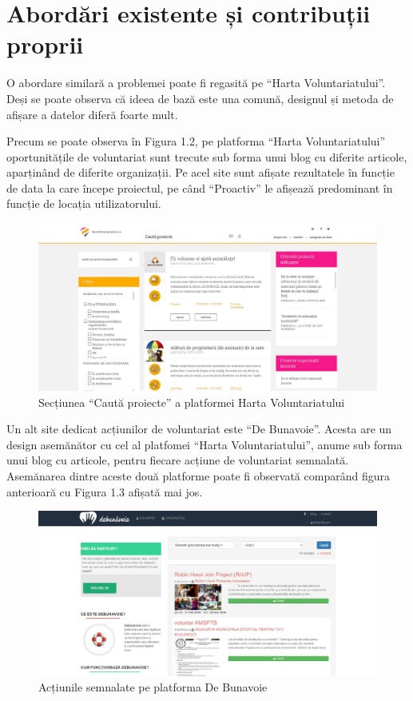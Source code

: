 \documentclass[12pt,a4paper]{report}
\begin{document}
\section{Abordări existente și contribuții proprii}
\par
O abordare similară a problemei poate fi regasită pe “Harta Voluntariatului”\cite{hv}. Deși se poate observa că ideea de bază este una comună, designul și metoda de afișare a datelor diferă foarte mult. 
\\ \par
Precum se poate observa în Figura 1.2, pe platforma “Harta Voluntariatului” oportunitățile de voluntariat sunt trecute sub forma unui blog cu diferite articole, aparținând de diferite organizații. Pe acel site sunt afișate rezultatele în funcție de data la care începe proiectul, pe când “Proactiv” le afișează predominant în funcție de locația utilizatorului.
\begin{figure}[H]
\centering
  \includegraphics[width=1\linewidth]{./imagini/hv1.jpg}
  \caption{Secțiunea “Caută proiecte” a platformei Harta Voluntariatului}
\end{figure}

\newpage
Un alt site dedicat acțiunilor de voluntariat este “De Bunavoie”\cite{dbv}. Acesta are un design asemănător cu cel al platfomei “Harta Voluntariatului”, anume sub forma unui blog cu articole, pentru fiecare acțiune de voluntariat semnalată. Asemănarea dintre aceste două platforme poate fi observată comparând figura anterioară cu Figura 1.3 afișată mai jos.
\begin{figure}[H]
\centering
  \includegraphics[width=1\linewidth]{./imagini/dbv1.jpg}
  \caption{Acțiunile semnalate pe platforma De Bunavoie}
\end{figure}
\end{document}
